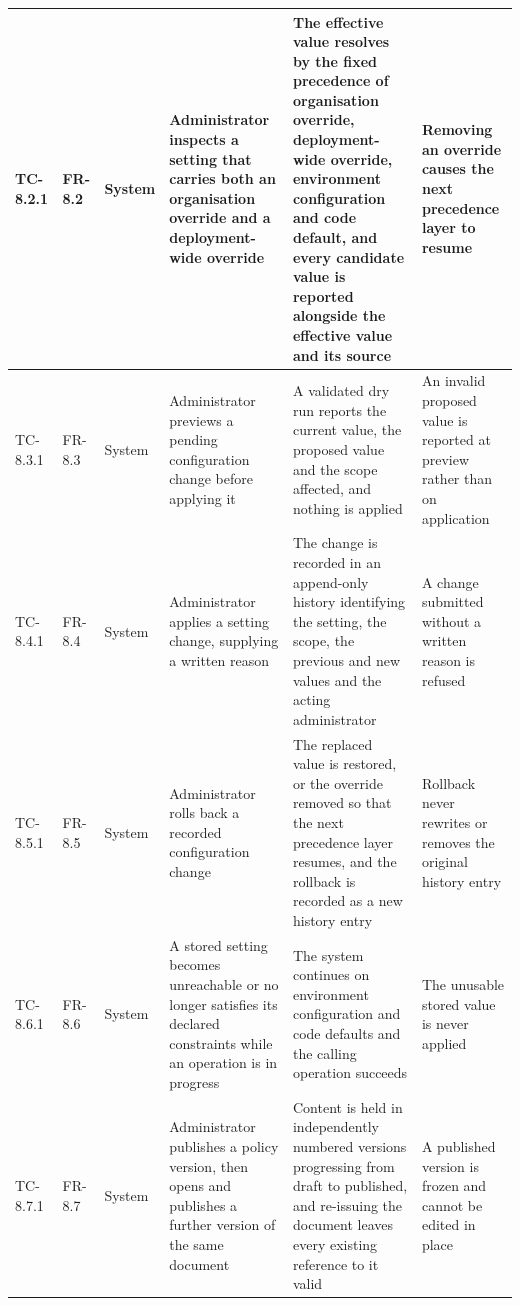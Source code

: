\begin{longtable}{|>{\centering\arraybackslash}m{}|>{\centering\arraybackslash}m{}|>{\centering\arraybackslash}m{}|m{}|m{}|m{}|}
TC-8.2.1 & FR-8.2 & System & Administrator inspects a setting that carries both an organisation override and a deployment-wide override & The effective value resolves by the fixed precedence of organisation override, deployment-wide override, environment configuration and code default, and every candidate value is reported alongside the effective value and its source & Removing an override causes the next precedence layer to resume \\ \hline

TC-8.3.1 & FR-8.3 & System & Administrator previews a pending configuration change before applying it & A validated dry run reports the current value, the proposed value and the scope affected, and nothing is applied & An invalid proposed value is reported at preview rather than on application \\ \hline

TC-8.4.1 & FR-8.4 & System & Administrator applies a setting change, supplying a written reason & The change is recorded in an append-only history identifying the setting, the scope, the previous and new values and the acting administrator & A change submitted without a written reason is refused \\ \hline

TC-8.5.1 & FR-8.5 & System & Administrator rolls back a recorded configuration change & The replaced value is restored, or the override removed so that the next precedence layer resumes, and the rollback is recorded as a new history entry & Rollback never rewrites or removes the original history entry \\ \hline

TC-8.6.1 & FR-8.6 & System & A stored setting becomes unreachable or no longer satisfies its declared constraints while an operation is in progress & The system continues on environment configuration and code defaults and the calling operation succeeds & The unusable stored value is never applied \\ \hline

TC-8.7.1 & FR-8.7 & System & Administrator publishes a policy version, then opens and publishes a further version of the same document & Content is held in independently numbered versions progressing from draft to published, and re-issuing the document leaves every existing reference to it valid & A published version is frozen and cannot be edited in place \\ \hline


\end{longtable}
